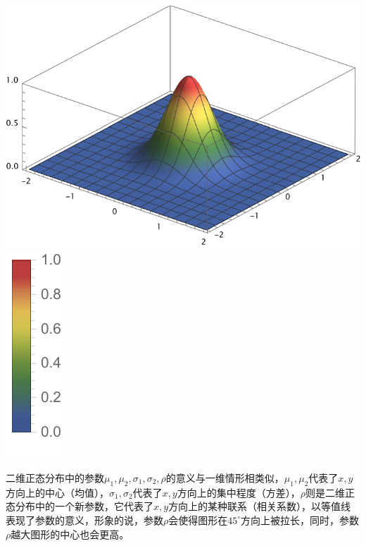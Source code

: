 \begin{Figure}[二维正态分布]
    \includegraphics[scale=0.75]{Mathematica/output/Gauss2D44.pdf}
    \hspace{0.2cm}
    \includegraphics[scale=1.0]{Mathematica/output/Gauss2DColorbar.pdf}
\end{Figure}
二维正态分布中的参数$\mu_1,\mu_2,\sigma_1,\sigma_2,\rho$的意义与一维情形相类似，$\mu_1,\mu_2$代表了$x,y$方向上的中心（均值），$\sigma_1,\sigma_2$代表了$x,y$方向上的集中程度（方差），$\rho$则是二维正态分布中的一个新参数，它代表了$x,y$方向上的某种联系（相关系数），以等值线表现了参数的意义，形象的说，参数$\rho$会使得图形在$45^{\circ}$方向上被拉长，同时，参数$\rho$越大图形的中心也会更高。

